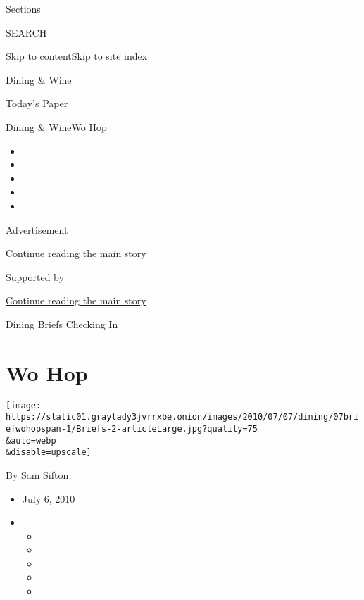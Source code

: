 Sections

SEARCH

\protect\hyperlink{site-content}{Skip to
content}\protect\hyperlink{site-index}{Skip to site index}

\href{https://www.nytimes3xbfgragh.onion/pages/dining/index.html}{Dining
\& Wine}

\href{https://myaccount.nytimes3xbfgragh.onion/auth/login?response_type=cookie\&client_id=vi}{}

\href{https://www.nytimes3xbfgragh.onion/section/todayspaper}{Today's
Paper}

\href{/pages/dining/index.html}{Dining \& Wine}\textbar{}Wo Hop

\begin{itemize}
\item
\item
\item
\item
\item
\end{itemize}

Advertisement

\protect\hyperlink{after-top}{Continue reading the main story}

Supported by

\protect\hyperlink{after-sponsor}{Continue reading the main story}

Dining Briefs \textbar{} Checking In

\hypertarget{wo-hop}{%
\section{Wo Hop}\label{wo-hop}}

\texttt{[image: https://static01.graylady3jvrrxbe.onion/images/2010/07/07/dining/07briefwohopspan-1/Briefs-2-articleLarge.jpg?quality=75\\\&auto=webp\\\&disable=upscale]}

By \href{https://www.nytimes3xbfgragh.onion/by/sam-sifton}{Sam Sifton}

\begin{itemize}
\item
  July 6, 2010
\item
  \begin{itemize}
  \item
  \item
  \item
  \item
  \item
  \end{itemize}
\end{itemize}

